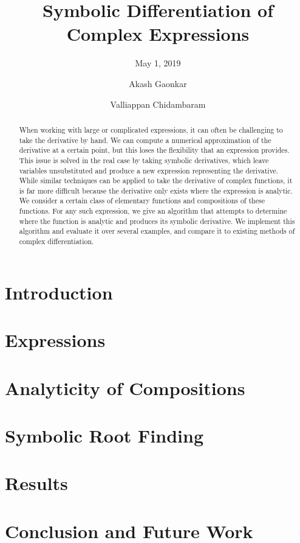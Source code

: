\documentclass[sigplan]{acmart}
\title{Symbolic Differentiation of Complex Expressions}
\subtitle{May 1, 2019}
\author{Akash Gaonkar}
\affiliation{Undergraduate Student, \institution{University of Colorado at Boulder}}
\author{Valliappan Chidambaram}
\affiliation{Undergraduate Student, \institution{University of Colorado at Boulder}}
\begin{document}
  \begin{abstract}
		When working with large or complicated expressions, it can often be challenging to take the derivative by hand. We can compute a numerical approximation of the derivative at a certain point, but this loses the flexibility that an expression provides. This issue is solved in the real case by taking symbolic derivatives, which leave variables unsubstituted and produce a new expression representing the derivative. While similar techniques can be applied to take the derivative of complex functions, it is far more difficult because the derivative only exists where the expression is analytic. We consider a certain class of elementary functions and compositions of these functions. For any such expression, we give an algorithm that attempts to determine where the function is analytic and produces its symbolic derivative. We implement this algorithm and evaluate it over several examples, and compare it to existing methods of complex differentiation.
  \end{abstract}

  \maketitle

  \section{Introduction}
  \label{sec:introduction}
  

  \section{Expressions}
  \label{sec:expressions}
  

  \section{Analyticity of Compositions}
  \label{sec:analyticity}
  

  \section{Symbolic Root Finding}
  \label{sec:rootfinding}
  

  \section{Results}
  \label{sec:results}
  

  \section{Conclusion and Future Work}
  \label{sec:conclusion}
  
\end{document}
